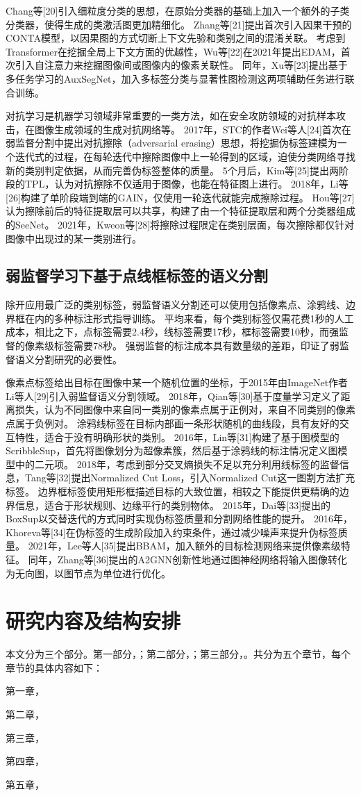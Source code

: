 Chang等[20]引入细粒度分类的思想，在原始分类器的基础上加入一个额外的子类分类器，使得生成的类激活图更加精细化。
Zhang等[21]提出首次引入因果干预的CONTA模型，以因果图的方式切断上下文先验和类别之间的混淆关联。
考虑到Transformer在挖掘全局上下文方面的优越性，Wu等[22]在2021年提出EDAM，首次引入自注意力来挖掘图像间或图像内的像素关联性。
同年，Xu等[23]提出基于多任务学习的AuxSegNet，加入多标签分类与显著性图检测这两项辅助任务进行联合训练。
\par
对抗学习是机器学习领域非常重要的一类方法，如在安全攻防领域的对抗样本攻击，在图像生成领域的生成对抗网络等。
2017年，STC的作者Wei等人[24]首次在弱监督分割中提出对抗擦除（adversarial erasing）思想，将挖掘伪标签建模为一个迭代式的过程，在每轮迭代中擦除图像中上一轮得到的区域，迫使分类网络寻找新的类别判定依据，从而完善伪标签整体的质量。
5个月后，Kim等[25]提出两阶段的TPL，认为对抗擦除不仅适用于图像，也能在特征图上进行。
2018年，Li等[26]构建了单阶段端到端的GAIN，仅使用一轮迭代就能完成擦除过程。
Hou等[27]认为擦除前后的特征提取层可以共享，构建了由一个特征提取层和两个分类器组成的SeeNet。
2021年，Kweon等[28]将擦除过程限定在类别层面，每次擦除都仅针对图像中出现过的某一类别进行。
\subsection{弱监督学习下基于点线框标签的语义分割}
除开应用最广泛的类别标签，弱监督语义分割还可以使用包括像素点、涂鸦线、边界框在内的多种标注形式指导训练。
平均来看，每个类别标签仅需花费1秒的人工成本，相比之下，点标签需要2.4秒，线标签需要17秒，框标签需要10秒，而强监督的像素级标签需要78秒。
强弱监督的标注成本具有数量级的差距，印证了弱监督语义分割研究的必要性。
\par
像素点标签给出目标在图像中某一个随机位置的坐标，于2015年由ImageNet作者Li等人[29]引入弱监督语义分割领域。
2018年，Qian等[30]基于度量学习定义了距离损失，认为不同图像中来自同一类别的像素点属于正例对，来自不同类别的像素点属于负例对。
涂鸦线标签在目标内部画一条形状随机的曲线段，具有友好的交互特性，适合于没有明确形状的类别。
2016年，Lin等[31]构建了基于图模型的ScribbleSup，首先将图像划分为超像素簇，然后基于涂鸦线的标注情况定义图模型中的二元项。
2018年，考虑到部分交叉熵损失不足以充分利用线标签的监督信息，Tang等[32]提出Normalized Cut Loss，引入Normalized Cut这一图割方法扩充标签。
边界框标签使用矩形框描述目标的大致位置，相较之下能提供更精确的边界信息，适合于形状规则、边缘平行的类别物体。
2015年，Dai等[33]提出的BoxSup以交替迭代的方式同时实现伪标签质量和分割网络性能的提升。
2016年，Khoreva等[34]在伪标签的生成阶段加入约束条件，通过减少噪声来提升伪标签质量。
2021年，Lee等人[35]提出BBAM，加入额外的目标检测网络来提供像素级特征。
同年，Zhang等[36]提出的A2GNN创新性地通过图神经网络将输入图像转化为无向图，以图节点为单位进行优化。
\section{研究内容及结构安排}
本文分为三个部分。第一部分，；第二部分，；第三部分，。共分为五个章节，每个章节的具体内容如下：
\par
第一章，
\par
第二章，
\par
第三章，
\par
第四章，
\par
第五章，
